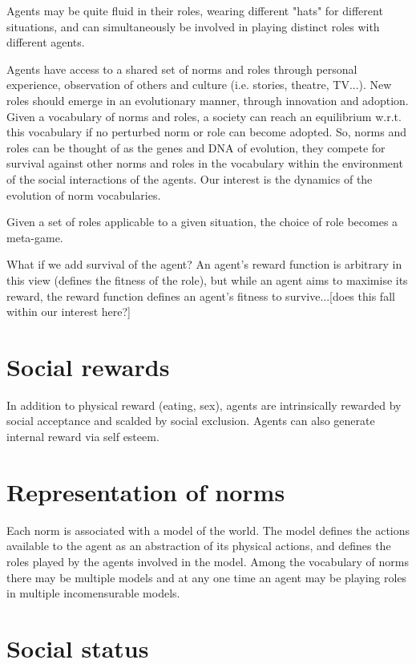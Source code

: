\documentclass[a4paper]{article}
\begin{document}
Agents may be quite fluid in their roles, wearing different "hats" for different situations, and can simultaneously be involved in playing distinct roles with different agents.

Agents have access to a shared set of norms and roles through personal experience, observation of others and culture (i.e. stories, theatre, TV...). New roles should emerge in an evolutionary manner, through innovation and adoption. Given a vocabulary of norms and roles, a society can reach an equilibrium w.r.t. this vocabulary if no perturbed norm or role can become adopted. So, norms and roles can be thought of as the genes and DNA of evolution, they compete for survival against other norms and roles in the vocabulary within the environment of the social interactions of the agents. Our interest is the dynamics of the evolution of norm vocabularies.

Given a set of roles applicable to a given situation, the choice of role becomes a meta-game.

What if we add survival of the agent?
An agent's reward function is arbitrary in this view (defines the fitness of the role), but while an agent aims to maximise its reward, the reward function defines an agent's fitness to survive...[does this fall within our interest here?]

\section{Social rewards}

In addition to physical reward (eating, sex), agents are intrinsically rewarded by social acceptance and scalded by social exclusion. Agents can also generate internal reward via self esteem.

\section{Representation of norms}

Each norm is associated with a model of the world. The model defines the actions available to the agent as an abstraction of its physical actions, and defines the roles played by the agents involved in the model. Among the vocabulary of norms there may be multiple models and at any one time an agent may be playing roles in multiple incomensurable models. 


\section{Social status}
\end{document}
